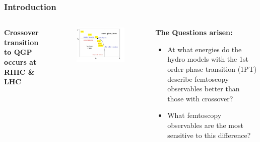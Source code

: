 \documentclass[dvipsnames] {beamer}
\begin{document}
\begin{frame}
  \frametitle{Introduction}
  \begin{columns}[c]
    \begin{block}{}
      \bf Crossover transition to QGP occurs at RHIC \& LHC
    \end{block}
    \begin{block}{}
      \begin{figure}[H]
        \includegraphics[width=1.\linewidth]{corr_femto5.png}
      \end{figure}
    \end{block}
    \begin{block}{\center \bf \alert{The Questions arisen:}}
      {\bf 
       \begin{itemize}
       \item At what energies do the hydro models with the 1st order phase transition (1PT) describe femtoscopy observables better than those
         with crossover?
       \item What femtoscopy observables are the most sensitive to this difference?
       \end{itemize}
       }
     \end{block}
  \end{columns}
\end{frame}
\end{document}
